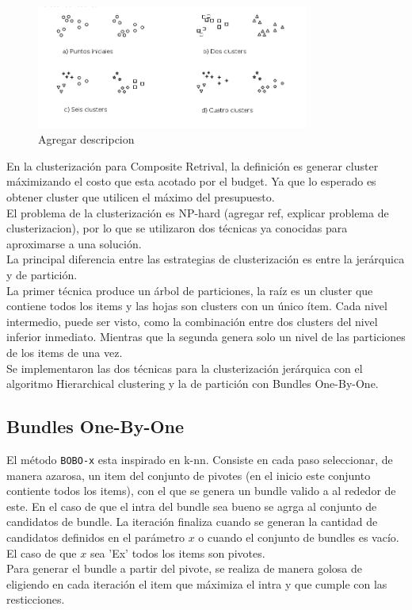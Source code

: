 \begin{figure}[H]
  \centering
    \includegraphics[width=0.8\textwidth]{img/howToCluster.png}
  \caption{Agregar descripcion}
  \label{res:img-howToCluster}
\end{figure}

En la clusterización para Composite Retrival, la definición es generar cluster máximizando el costo que esta acotado por el budget.
Ya que lo esperado es obtener cluster que utilicen el máximo del presupuesto.\\

El problema de la clusterización es NP-hard (agregar ref, explicar problema de clusterizacion),
por lo que se utilizaron dos técnicas ya conocidas para aproximarse a una solución.\\
La principal diferencia entre las estrategias de clusterización es entre la jerárquica y de 
partición.\\
La primer técnica produce un árbol de particiones, la raíz es un cluster que contiene todos los items
y las hojas son clusters con un único ítem. Cada nivel intermedio, puede ser visto, como la 
combinación entre dos clusters del nivel inferior inmediato. Mientras que la segunda genera solo un 
nivel de las particiones de los items de una vez.\\ 
Se implementaron las dos técnicas para la clusterización jerárquica con el algoritmo
Hierarchical clustering y la de partición con Bundles One-By-One.\\

\subsection{Bundles One-By-One}
El método \texttt{BOBO-x} esta inspirado en k-nn. Consiste en cada paso seleccionar, de manera azarosa, un item del conjunto de pivotes (en el inicio este conjunto contiente todos los items),
con el que se genera un bundle valido a al rededor de este. En el caso de que el intra del bundle sea bueno se agrga al conjunto de candidatos de bundle.
La iteración finaliza cuando se generan la cantidad de candidatos definidos en el parámetro $x$ o cuando el conjunto de bundles es vacío. El caso de que $x$ sea 'Ex' todos los 
items son pivotes.\\
Para generar el bundle a partir del pivote, se realiza de manera golosa de eligiendo en cada iteración el item que
máximiza el intra y que cumple con las resticciones.\\
